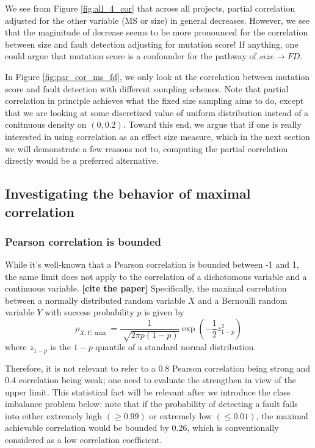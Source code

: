 \documentclass[10pt,letterpaper]{article}
\newcommand{\hl}[2]{{\color{#1}\bfseries [#2]}}
\newcommand{\todo}[1]{\hl{red}{#1}}
\begin{document}
We see from Figure \ref{fig:all_4_cor} that across all projects, partial correlation adjusted for the other variable (MS or size) in general decreases. However, we see that the maginitude of decrease seems to be more pronounced for the correlation between size and fault detection adjusting for mutation score! If anything, one could argue that mutation score is a confounder for the pathway of $size \to FD$. 

In Figure \ref{fig:par_cor_ms_fd}, we only look at the correlation between mutation score and fault detection with different sampling schemes. Note that partial correlation in principle achieves what the fixed size sampling aims to do, except that we are looking at some discretized value of uniform distribution instead of a conitnuous density on $(0,0.2)$. Toward this end, we argue that if one is really interested in using correlation as an effect size measure, which in the next section we will demonstrate a few reasons not to, computing the partial correlation directly would be a preferred alternative.

\subsection{Investigating the behavior of maximal correlation}

\subsubsection{Pearson correlation is bounded}

While it's well-known that a Pearson correlation is bounded between -1 and 1, the same limit does not apply to the correlation of a dichotomous variable and a continuous variable. \todo{cite the paper} Specifically, the maximal correlation between a normally distributed random variable $X$ and a Bernoulli random variable $Y$ with success probability $p$ is given by  
\begin{equation}
\rho_{X,Y;\max} = \frac{1}{\sqrt[]{2\pi p (1-p)}} \exp(-\frac{1}{2}z_{1-p}^2)
\end{equation} where $z_{1-p}$ is the $1-p$ quantile of a standard normal distribution. 

Therefore, it is not relevant to refer to a 0.8 Pearson correlation being strong and 0.4 correlation being weak; one need to evaluate the strengthen in view of the upper limit. This statistical fact will be relevant after we introduce the class imbalance problem below: note that if the probability of detecting a fault fails into either extremely high $(\geq 0.99)$ or extremely low $(\leq 0.01)$, the maximal achievable correlation would be bounded by 0.26, which is conventionally considered as a low correlation coefficient.
\end{document}
